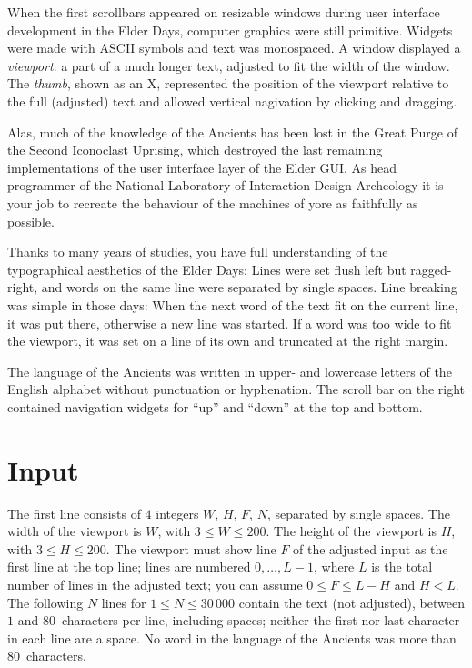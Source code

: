 

When the first scrollbars appeared on resizable windows during user interface development in the Elder Days, computer graphics were still primitive.
Widgets were made with ASCII symbols and text was monospaced.
A window displayed a \emph{viewport}: a part of a much longer text, adjusted to fit the width of the window.
The \emph{thumb}, shown as an X, represented the position of the viewport relative to the full (adjusted) text and allowed vertical nagivation by clicking and dragging.

Alas, much of the knowledge of the Ancients has been lost in the Great Purge of the Second Iconoclast Uprising, which destroyed the last remaining implementations of the user interface layer of the Elder GUI. 
As head programmer of the National Laboratory of Interaction Design Archeology it is your job to recreate the behaviour of the machines of yore as faithfully as possible.

Thanks to many years of studies, you have full understanding of the typographical aesthetics of the Elder Days:
Lines were set flush left but ragged-right, and words on the same line were separated by single spaces. 
Line breaking was simple in those days:
When the next word of the text fit on the current line, it was put there, otherwise a new line was started.
If a word was too wide to fit the viewport, it was set on a line of its own and truncated at the right margin.

The language of the Ancients was written in upper- and lowercase letters of the English alphabet without punctuation or hyphenation.
The scroll bar on the right contained navigation widgets for ``up'' and ``down'' at the top and bottom. 

\section*{Input}

The first line consists of $4$ integers $W$, $H$, $F$, $N$, separated by single spaces.
The width of the viewport is $W$, with $3\leq W\leq 200$.
The height of the viewport is $H$, with $3\leq H\leq 200$.
The viewport must show line $F$ of the adjusted input as the first line at the top line; lines are numbered $0,\ldots, L-1$, where $L$ is the total number of lines in the adjusted text; you can assume $0\leq F \leq L - H$ and $H < L$.
The following $N$ lines for $1\leq N\leq 30\,000$ contain the text (not adjusted), between $1$ and $80$~characters per line, including spaces; neither the first nor last character in each line are a space.
No word in the language of the Ancients was more than $80$~characters.


